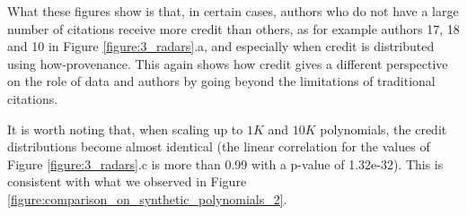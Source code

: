 What these figures show is that, in certain cases, authors who do not have a large number of citations receive more credit than others, as for example authors 17, 18 and 10 in Figure \ref{figure:3_radars}.a, 
and especially when credit is distributed using how-provenance.
This again shows how credit gives a different perspective on the role of data and authors by going beyond the limitations of traditional citations.  

It is worth noting that, when scaling up to $1K$ and $10K$ polynomials, the credit distributions  become almost identical  
 (the linear correlation for the values of Figure \ref{figure:3_radars}.c is more than 0.99 with a p-value of 1.32e-32). This is consistent with what we observed in Figure \ref{figure:comparison_on_synthetic_polynomials_2}.


